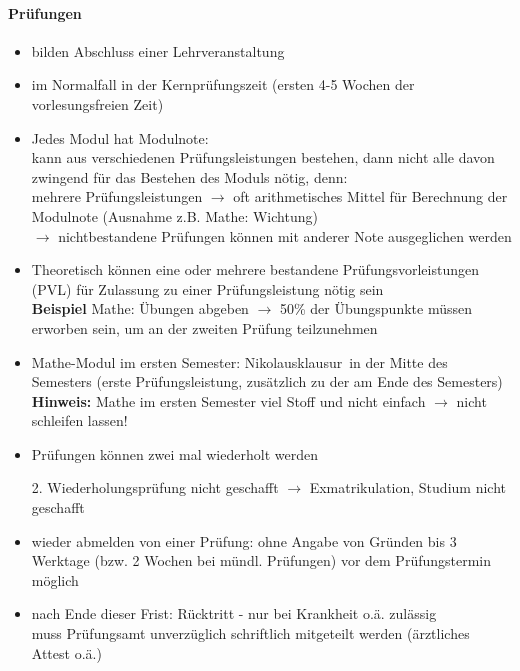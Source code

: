 \documentclass[a4paper,12pt]{report}
\begin{document}
\paragraph{Prüfungen}
\begin{itemize}
	\item bilden Abschluss einer Lehrveranstaltung
	\item im Normalfall in der Kernprüfungszeit (ersten 4-5 Wochen der vorlesungsfreien Zeit)
	\item Jedes Modul hat Modulnote:\\
		kann aus verschiedenen Prüfungsleistungen bestehen, dann nicht alle davon zwingend für das Bestehen des Moduls nötig, denn:\\
		mehrere Prüfungsleistungen $\rightarrow$ oft arithmetisches Mittel für Berechnung der Modulnote (Ausnahme z.B. Mathe: Wichtung)\\
		$\longrightarrow$ nichtbestandene Prüfungen können mit anderer Note ausgeglichen werden		
	\item Theoretisch können eine oder mehrere bestandene Prüfungsvorleistungen (PVL) für Zulassung zu einer Prüfungsleistung nötig sein\\
		\textbf{Beispiel} Mathe: Übungen abgeben $\rightarrow$ 50\% der Übungspunkte müssen erworben sein, um an der zweiten Prüfung teilzunehmen
	\item Mathe-Modul im ersten Semester: \glqq Nikolausklausur\grqq\ in der Mitte des Semesters (erste Prüfungsleistung, zusätzlich zu der am Ende des Semesters)\\
	\textbf{Hinweis:} Mathe im ersten Semester viel Stoff und nicht einfach $\rightarrow$ nicht schleifen lassen!
	\item Prüfungen können zwei mal wiederholt werden
	2. Wiederholungsprüfung nicht geschafft $\rightarrow$ Exmatrikulation, Studium nicht geschafft
	\item wieder abmelden von einer Prüfung: ohne Angabe von Gründen bis 3 Werktage (bzw. 2 Wochen bei mündl. Prüfungen) vor dem Prüfungstermin möglich
	\item nach Ende dieser Frist: Rücktritt - nur bei Krankheit o.ä. zulässig\\ 
		muss Prüfungsamt unverzüglich schriftlich mitgeteilt werden (ärztliches Attest o.ä.)

\end{itemize}
\end{document}
